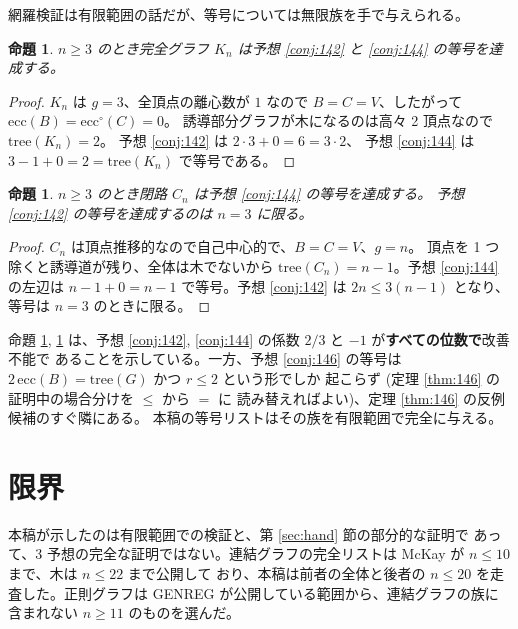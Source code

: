 \documentclass[paper=a4,fontsize=10.5pt,jafontsize=10.5pt]{jlreq}
\theoremstyle{plain}
\newtheorem{proposition}[theorem]{命題}
\theoremstyle{definition}
\begin{document}
網羅検証は有限範囲の話だが、等号については無限族を手で与えられる。

\begin{proposition}\label{prop:kn}
$n \ge 3$ のとき完全グラフ $K_n$ は予想 \ref{conj:142} と
\ref{conj:144} の等号を達成する。
\end{proposition}

\begin{proof}
$K_n$ は $g = 3$、全頂点の離心数が $1$ なので $B = C = V$、したがって
$\mathrm{ecc}(B) = \mathrm{ecc}^{\circ}(C) = 0$。
誘導部分グラフが木になるのは高々 2 頂点なので $\mathrm{tree}(K_n) = 2$。
予想 \ref{conj:142} は $2\cdot 3 + 0 = 6 = 3 \cdot 2$、
予想 \ref{conj:144} は $3 - 1 + 0 = 2 = \mathrm{tree}(K_n)$ で等号である。
\end{proof}

\begin{proposition}\label{prop:cn}
$n \ge 3$ のとき閉路 $C_n$ は予想 \ref{conj:144} の等号を達成する。
予想 \ref{conj:142} の等号を達成するのは $n = 3$ に限る。
\end{proposition}

\begin{proof}
$C_n$ は頂点推移的なので自己中心的で、$B = C = V$、$g = n$。
頂点を 1 つ除くと誘導道が残り、全体は木でないから
$\mathrm{tree}(C_n) = n - 1$。予想 \ref{conj:144} の左辺は
$n - 1 + 0 = n-1$ で等号。予想 \ref{conj:142} は
$2n \le 3(n-1)$ となり、等号は $n = 3$ のときに限る。
\end{proof}

命題 \ref{prop:kn}, \ref{prop:cn} は、予想 \ref{conj:142},
\ref{conj:144} の係数 $2/3$ と $-1$ が\textbf{すべての位数で}改善不能で
あることを示している。一方、予想 \ref{conj:146} の等号は
$2\,\mathrm{ecc}(B) = \mathrm{tree}(G)$ かつ $r \le 2$ という形でしか
起こらず (定理 \ref{thm:146} の証明中の場合分けを $\le$ から $=$ に
読み替えればよい)、定理 \ref{thm:146} の反例候補のすぐ隣にある。
本稿の等号リストはその族を有限範囲で完全に与える。

\section{限界}

本稿が示したのは有限範囲での検証と、第 \ref{sec:hand} 節の部分的な証明で
あって、3 予想の完全な証明ではない。連結グラフの完全リストは
McKay \cite{mckay} が $n \le 10$ まで、木は $n \le 22$ まで公開して
おり、本稿は前者の全体と後者の $n \le 20$ を走査した。正則グラフは
GENREG \cite{genreg} が公開している範囲から、連結グラフの族に含まれない
$n \ge 11$ のものを選んだ。
\end{document}
